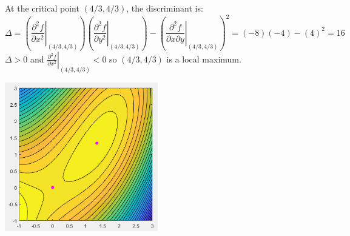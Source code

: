 \documentclass{article}
\begin{document}
\begin{itemize}
At the critical point \((4/3, 4/3)\), the discriminant is:
\[\Delta = \left(\left.\frac{\partial^2 f}{\partial x^2}\right|_{(4/3, 4/3)}\right)\left(\left.\frac{\partial^2 f}{\partial y^2}\right|_{(4/3, 4/3)}\right) - \left(\left.\frac{\partial^2 f}{\partial x \partial y}\right|_{(4/3, 4/3)}\right)^2 = (-8)(-4) - (4)^2 = 16\]
\(\Delta > 0\) and \(\left.\frac{\partial^2 f}{\partial x^2}\right|_{(4/3, 4/3)} < 0\) so \((4/3, 4/3)\) is a local maximum.

\begin{center}
\includegraphics[width = 0.5\textwidth]{critical_points_1.png}
\end{center}


\end{itemize}
\end{document}
